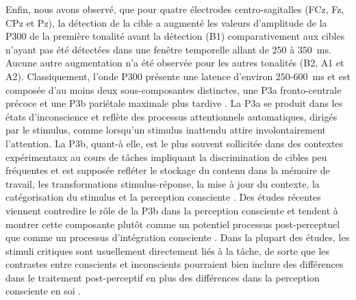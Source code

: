 Enfin, nous avons observé, que pour quatre électrodes centro-sagitalles (FCz, Fz, CPz et Pz), la détection de la cible a augmenté les valeurs d'amplitude de la P300 de la première tonalité avant la détection (B1) comparativement aux cibles n'ayant pas été détectées dans une fenêtre temporelle allant de $250$ à $350$~ms. 
Aucune autre augmentation n'a été observée pour les autres tonalités (B2, A1 et A2).
Classiquement, l'onde P300 présente une latence d'environ $250$-$600$~ms et est composée d'au moins deux sous-composantes distinctes, une P3a fronto-centrale précoce et une P3b pariétale maximale plus tardive \citep{dembski2021perceptual}. 
La P3a se produit dans les états d'inconscience et reflète des processus attentionnels automatiques, dirigés par le stimulus, comme lorsqu'un stimulus inattendu attire involontairement l'attention.
La P3b, quant-à elle, est le plus souvent sollicitée dans des contextes expérimentaux au cours de tâches impliquant la discrimination de cibles peu fréquentes et est supposée refléter le stockage du contenu dans la mémoire de travail, les transformations stimulus-réponse, la mise à jour du contexte, la catégorisation du stimulus et la perception consciente \citep{dehaene2011experimental, dembski2021perceptual, luck2014introduction, sergent2005timing}. 
Des études récentes viennent contredire le rôle de la P3b dans la perception consciente et tendent à montrer cette composante plutôt comme un potentiel processus post-perceptuel que comme un processus d'intégration consciente \citep{cohen2020distinguishing, fishman2021learning, pitts2014gamma, pitts2014isolating, tsuchiya2015no}. 
Dans la plupart des études, les stimuli critiques sont usuellement directement liés à la tâche, de sorte que les contrastes entre conscients et inconscients pourraient bien inclure des différences dans le traitement post-perceptif en plus des différences dans la perception consciente en soi \citep{tsuchiya2015no}. 

